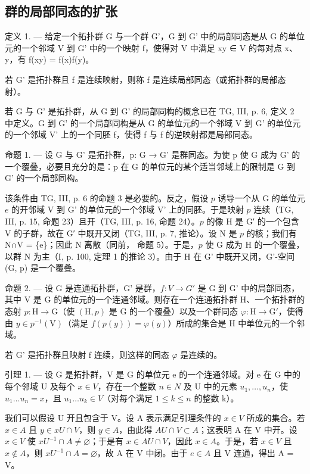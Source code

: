 \subsection{群的局部同态的扩张}

定义 1. --- 给定一个拓扑群 G 与一个群 G'，G 到 G' 中的局部同态是从 G 的单位元的一个邻域 V 到 G' 中的一个映射 f，使得对 V 中满足 xy ∈ V 的每对点 x、y，有 f(xy) = f(x)f(y)。

若 G' 是拓扑群且 f 是连续映射，则称 f 是连续局部同态（或拓扑群的局部态射）。

若 G 与 G' 是拓扑群，从 G 到 G' 的局部同构的概念已在 TG, III, p. 6, 定义 2 中定义。G 到 G' 的一个局部同构是从 G 的单位元的一个邻域 V 到 G' 的单位元的一个邻域 V' 上的一个同胚 f，使得 f 与 f 的逆映射都是局部同态。

命题 1. --- 设 G 与 G' 是拓扑群，p: G → G' 是群同态。为使 p 使 G 成为 G' 的一个覆叠，必要且充分的是：p 在 G 的单位元的某个适当邻域上的限制是 G 到 G' 的一个局部同构。

该条件由 TG, III, p. 6 的命题 3 是必要的。反之，假设 \(p\) 诱导一个从 G 的单位元 \(e\) 的开邻域 V 到 G' 的单位元的一个邻域 V' 上的同胚。于是映射 \(p\) 连续（TG, III, p. 15, 命题 23）且开（TG, III, p. 16, 命题 24）。\(p\) 的像 H 是 G′ 的一个包含 V 的子群，故在 G′ 中既开又闭（TG, III, p. 7, 推论）。设 N 是 \(p\) 的核；我们有 N∩V = \{e\}；因此 N 离散（同前， 命题 5）。于是，\(p\) 使 G 成为 H 的一个覆叠，以群 N 为主（I, p. 100, 定理 1 的推论 3）。由于 H 在 G' 中既开又闭，G'-空间 (G, p) 是一个覆叠。

命题 2. --- 设 G 是连通拓扑群，G' 是群，\(f: V \to G'\) 是 G 到 G' 中的局部同态，其中 V 是 G 的单位元的一个连通邻域。则存在一个连通拓扑群 H、一个拓扑群的态射 \(p\colon\mathrm{H}\to\mathrm{G}\)（使 \((\mathrm{H},p)\) 是 G 的一个覆叠）以及一个群同态 \(\varphi\colon\mathrm{H}\to\mathrm{G}'\)，使得由 \(y\in p^{-1}(\mathrm{V})\)（满足 \(f(p(y))=\varphi(y)\)）所成的集合是 H 中单位元的一个邻域。

若 G' 是拓扑群且映射 f 连续，则这样的同态 \(\varphi\) 是连续的。

引理 1. — 设 G 是拓扑群，V 是 G 的单位元 e 的一个连通邻域。对 e 在 G 中的每个邻域 U 及每个 \(x \in V\)，存在一个整数 \(n \in N\) 及 U 中的元素 \(u_{1}, \ldots, u_{n}\)，使 \(u_{1} \ldots u_{n} = x\)，且 \(u_{1} \ldots u_{k} \in V\)（对每个满足 \(1 \leqslant k \leqslant n\) 的整数 k）。

我们可以假设 U 开且包含于 V。设 A 表示满足引理条件的 \(x \in V\) 所成的集合。若 \(x \in A\) 且 \(y \in xU \cap V\)，则 \(y \in A\)，由此得 \(AU \cap V \subset A\)；这表明 A 在 V 中开。设 \(x \in V\) 使 \(xU^{-1} \cap A \neq \varnothing\)；于是有 \(x \in AU \cap V\)，因此 \(x \in A\)。于是，若 \(x \in V\) 且 \(x \notin A\)，则 \(xU^{-1} \cap A = \varnothing\)，故 A 在 V 中闭。由于 \(e \in A\) 且 V 连通，得出 A = V。

